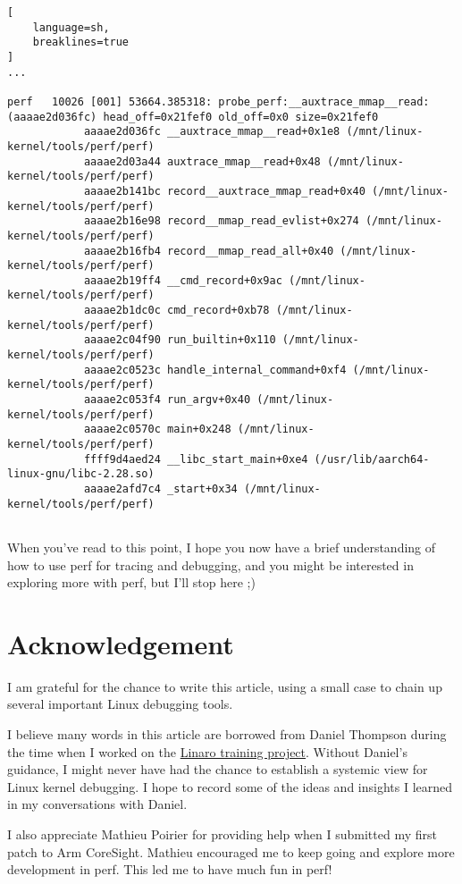 \documentclass[11pt]{diazessay} %
\begin{document}
\begin{lstlisting}[
  	language=sh,
	breaklines=true
]
...

perf   10026 [001] 53664.385318: probe_perf:__auxtrace_mmap__read: (aaaae2d036fc) head_off=0x21fef0 old_off=0x0 size=0x21fef0
            aaaae2d036fc __auxtrace_mmap__read+0x1e8 (/mnt/linux-kernel/tools/perf/perf)
            aaaae2d03a44 auxtrace_mmap__read+0x48 (/mnt/linux-kernel/tools/perf/perf)
            aaaae2b141bc record__auxtrace_mmap_read+0x40 (/mnt/linux-kernel/tools/perf/perf)
            aaaae2b16e98 record__mmap_read_evlist+0x274 (/mnt/linux-kernel/tools/perf/perf)
            aaaae2b16fb4 record__mmap_read_all+0x40 (/mnt/linux-kernel/tools/perf/perf)
            aaaae2b19ff4 __cmd_record+0x9ac (/mnt/linux-kernel/tools/perf/perf)
            aaaae2b1dc0c cmd_record+0xb78 (/mnt/linux-kernel/tools/perf/perf)
            aaaae2c04f90 run_builtin+0x110 (/mnt/linux-kernel/tools/perf/perf)
            aaaae2c0523c handle_internal_command+0xf4 (/mnt/linux-kernel/tools/perf/perf)
            aaaae2c053f4 run_argv+0x40 (/mnt/linux-kernel/tools/perf/perf)
            aaaae2c0570c main+0x248 (/mnt/linux-kernel/tools/perf/perf)
            ffff9d4aed24 __libc_start_main+0xe4 (/usr/lib/aarch64-linux-gnu/libc-2.28.so)
            aaaae2afd7c4 _start+0x34 (/mnt/linux-kernel/tools/perf/perf)


\end{lstlisting}

When you've read to this point, I hope you now have a brief understanding
of how to use perf for tracing and debugging, and you might be interested
in exploring more with perf, but I'll stop here ;)

\section*{Acknowledgement}

I am grateful for the chance to write this article, using a small case to
chain up several important Linux debugging tools.

I believe many words in this article are borrowed from Daniel Thompson during
the time when I worked on the
\href{https://www.linaro.org/services/hands-on-training/}{Linaro training project}.
Without Daniel’s guidance, I might never have had the chance to establish a
systemic view for Linux kernel debugging. I hope to record some of the ideas and
insights I learned in my conversations with Daniel.

I also appreciate Mathieu Poirier for providing help when I submitted my first
patch to Arm CoreSight. Mathieu encouraged me to keep going and explore more
development in perf. This led me to have much fun in perf!
\end{document}
